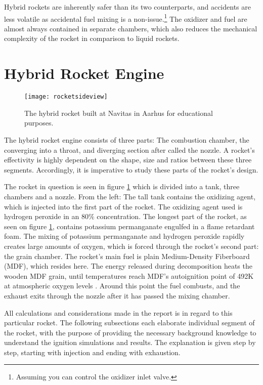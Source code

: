 	Hybrid rockets are inherently safer than its two counterparts, and accidents are less volatile as accidental fuel mixing is a non-issue.\footnote{Assuming you can control the oxidizer inlet valve.} The oxidizer and fuel are almost always contained in separate chambers, which also reduces the mechanical complexity of the rocket in comparison to liquid rockets.

\section{Hybrid Rocket Engine}

\begin{figure}
	\centering
	\texttt{[image: rocketsideview]}
	\caption{The hybrid rocket built at Navitas in Aarhus for educational purposes.}
	\label{fig:rocketpic}
\end{figure}

	The hybrid rocket engine consists of three parts: The combustion chamber, the converging into a throat, and diverging section after called the nozzle. A rocket's effectivity is highly dependent on the shape, size and ratios between these three segments. Accordingly, it is imperative to study these parts of the rocket's design.

	The rocket in question is seen in figure \ref{fig:rocketpic} which is divided into a tank, three chambers and a nozzle. From the left: The tall tank contains the oxidizing agent, which is injected into the first part of the rocket. The oxidizing agent used is hydrogen peroxide in an $80\%$ concentration. The longest part of the rocket, as seen on figure \ref{fig:rocketpic}, contains potassium permanganate engulfed in a flame retardant foam. The mixing of potassium permanganate and hydrogen peroxide rapidly creates large amounts of oxygen, which is forced through the rocket's second part: the grain chamber. The rocket's main fuel is plain Medium-Density Fiberboard (MDF), which resides here. The energy released during decomposition heats the wooden MDF grain, until temperatures reach MDF's autoignition point of 492K at atmospheric oxygen levels \cite{mdfAIT}. Around this point the fuel combusts, and the exhaust exits through the nozzle after it has passed the mixing chamber.

	All calculations and considerations made in the report is in regard to this particular rocket. The following subsections each elaborate individual segment of the rocket, with the purpose of providing the necessary background knowledge to understand the ignition simulations and results. The explanation is given step by step, starting with injection and ending with exhaustion.


